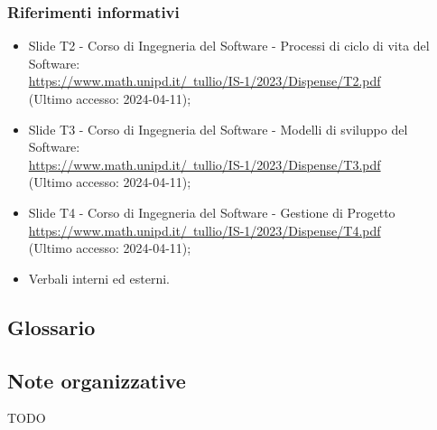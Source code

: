 \subsubsection{Riferimenti informativi}
\begin{itemize}
  \item Slide T2 - Corso di Ingegneria del Software - Processi di ciclo di vita del Software: \\ \href{https://www.math.unipd.it/~tullio/IS-1/2023/Dispense/T2.pdf}{https://www.math.unipd.it/~tullio/IS-1/2023/Dispense/T2.pdf}  \\ (Ultimo accesso: 2024-04-11);
  \item Slide T3 - Corso di Ingegneria del Software - Modelli di sviluppo del Software: \\ \href{https://www.math.unipd.it/~tullio/IS-1/2023/Dispense/T3.pdf}{https://www.math.unipd.it/~tullio/IS-1/2023/Dispense/T3.pdf}  \\ (Ultimo accesso: 2024-04-11);
  \item Slide T4 - Corso di Ingegneria del Software - Gestione di Progetto \\ \href{https://www.math.unipd.it/~tullio/IS-1/2023/Dispense/T4.pdf}{https://www.math.unipd.it/~tullio/IS-1/2023/Dispense/T4.pdf}  \\ (Ultimo accesso: 2024-04-11);
  \item Verbali interni ed esterni.
\end{itemize}

\subsection{Glossario} 
\GlossarioIntroduzione

\subsection{Note organizzative}
TODO